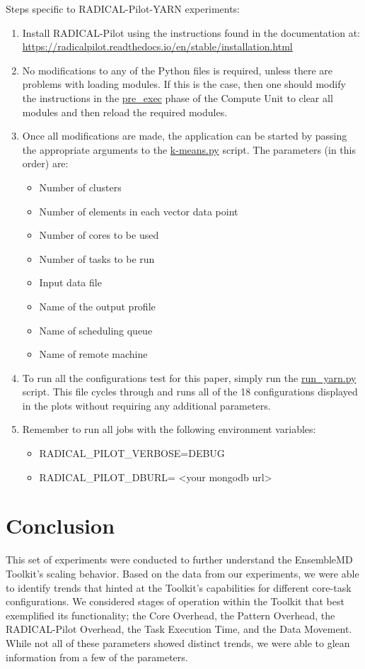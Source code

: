 \documentclass[]{article}
\begin{document}
		Steps specific to RADICAL-Pilot-YARN experiments:
		\begin{enumerate}
			\item Install RADICAL-Pilot using the instructions found in the documentation at: \\
			  \url{https://radicalpilot.readthedocs.io/en/stable/installation.html}
			\item No modifications to any of the Python files is required, unless there are problems with loading modules. If this is the case, then one should modify the instructions in the \url{pre_exec} phase of the Compute Unit to clear all modules and then reload the required modules.
			\item Once all modifications are made, the application can be started by passing the appropriate arguments to the \url{k-means.py} script. The parameters (in this order) are:
			\begin{itemize}
				\item Number of clusters
				\item Number of elements in each vector data point
				\item Number of cores to be used
				\item Number of tasks to be run
				\item Input data file
				\item Name of the output profile
				\item Name of scheduling queue
				\item Name of remote machine
			\end{itemize}
			\item To run all the configurations test for this paper, simply run the \url{run_yarn.py} script. This file cycles through and runs all of the 18 configurations displayed in the plots without requiring any additional parameters.
			\item Remember to run all jobs with the following environment variables:
			\begin{itemize}
				\item RADICAL\_PILOT\_VERBOSE=DEBUG
				\item RADICAL\_PILOT\_DBURL= <your mongodb url>
			\end{itemize}
		\end{enumerate}

\section{Conclusion}
	This set of experiments were conducted to further understand the EnsembleMD Toolkit's scaling behavior. Based on the data from our experiments, we were able to identify trends that hinted at the Toolkit's capabilities for different core-task configurations. We considered stages of operation within the Toolkit that best exemplified its functionality; the Core Overhead, the Pattern Overhead, the RADICAL-Pilot Overhead, the Task Execution Time, and the Data Movement. While not all of these parameters showed distinct trends, we were able to glean information from a few of the parameters.
\end{document}
